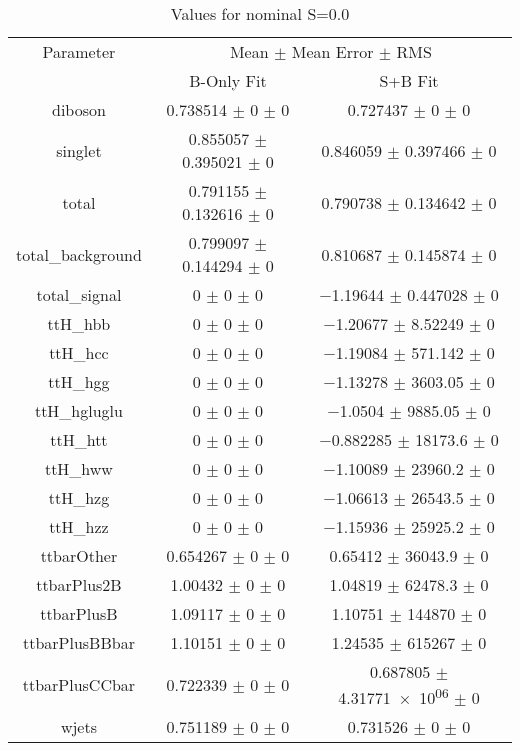 \begin{table}
\centering
\caption{Values for nominal S=0.0}
\begin{tabular}{ccc}
\toprule
Parameter & \multicolumn{2}{c}{Mean $\pm$ Mean Error $\pm$ RMS}\\
 & B-Only Fit & S+B Fit\\
\midrule
diboson & \num{0.738514} $\pm$ \num{0} $\pm$ \num{0} & \num{0.727437} $\pm$ \num{0} $\pm$ \num{0}\\
singlet & \num{0.855057} $\pm$ \num{0.395021} $\pm$ \num{0} & \num{0.846059} $\pm$ \num{0.397466} $\pm$ \num{0}\\
total & \num{0.791155} $\pm$ \num{0.132616} $\pm$ \num{0} & \num{0.790738} $\pm$ \num{0.134642} $\pm$ \num{0}\\
total\_background & \num{0.799097} $\pm$ \num{0.144294} $\pm$ \num{0} & \num{0.810687} $\pm$ \num{0.145874} $\pm$ \num{0}\\
total\_signal & \num{0} $\pm$ \num{0} $\pm$ \num{0} & \num{-1.19644} $\pm$ \num{0.447028} $\pm$ \num{0}\\
ttH\_hbb & \num{0} $\pm$ \num{0} $\pm$ \num{0} & \num{-1.20677} $\pm$ \num{8.52249} $\pm$ \num{0}\\
ttH\_hcc & \num{0} $\pm$ \num{0} $\pm$ \num{0} & \num{-1.19084} $\pm$ \num{571.142} $\pm$ \num{0}\\
ttH\_hgg & \num{0} $\pm$ \num{0} $\pm$ \num{0} & \num{-1.13278} $\pm$ \num{3603.05} $\pm$ \num{0}\\
ttH\_hgluglu & \num{0} $\pm$ \num{0} $\pm$ \num{0} & \num{-1.0504} $\pm$ \num{9885.05} $\pm$ \num{0}\\
ttH\_htt & \num{0} $\pm$ \num{0} $\pm$ \num{0} & \num{-0.882285} $\pm$ \num{18173.6} $\pm$ \num{0}\\
ttH\_hww & \num{0} $\pm$ \num{0} $\pm$ \num{0} & \num{-1.10089} $\pm$ \num{23960.2} $\pm$ \num{0}\\
ttH\_hzg & \num{0} $\pm$ \num{0} $\pm$ \num{0} & \num{-1.06613} $\pm$ \num{26543.5} $\pm$ \num{0}\\
ttH\_hzz & \num{0} $\pm$ \num{0} $\pm$ \num{0} & \num{-1.15936} $\pm$ \num{25925.2} $\pm$ \num{0}\\
ttbarOther & \num{0.654267} $\pm$ \num{0} $\pm$ \num{0} & \num{0.65412} $\pm$ \num{36043.9} $\pm$ \num{0}\\
ttbarPlus2B & \num{1.00432} $\pm$ \num{0} $\pm$ \num{0} & \num{1.04819} $\pm$ \num{62478.3} $\pm$ \num{0}\\
ttbarPlusB & \num{1.09117} $\pm$ \num{0} $\pm$ \num{0} & \num{1.10751} $\pm$ \num{144870} $\pm$ \num{0}\\
ttbarPlusBBbar & \num{1.10151} $\pm$ \num{0} $\pm$ \num{0} & \num{1.24535} $\pm$ \num{615267} $\pm$ \num{0}\\
ttbarPlusCCbar & \num{0.722339} $\pm$ \num{0} $\pm$ \num{0} & \num{0.687805} $\pm$ \num{4.31771e+06} $\pm$ \num{0}\\
wjets & \num{0.751189} $\pm$ \num{0} $\pm$ \num{0} & \num{0.731526} $\pm$ \num{0} $\pm$ \num{0}\\
\bottomrule
\end{tabular}
\end{table}